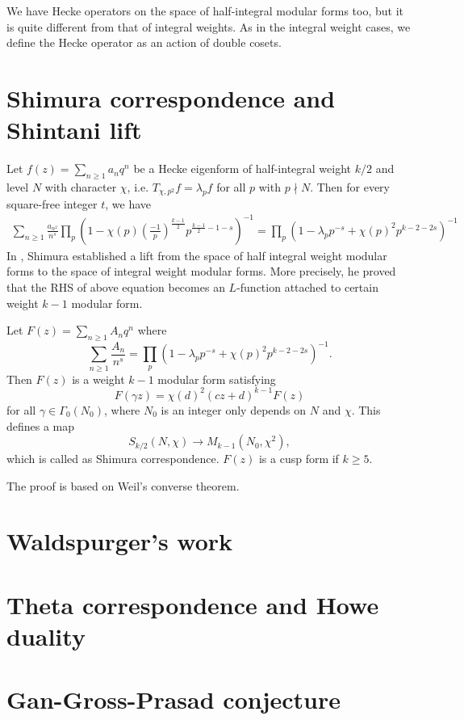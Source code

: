 We have Hecke operators on the space of half-integral modular forms too, but it is quite different from that of integral weights.
As in the integral weight cases, we define the Hecke operator as an action of double cosets.



\section{Shimura correspondence and Shintani lift}
Let $f(z) = \sum_{n \geq 1} a_{n}q^{n}$ be a Hecke eigenform of half-integral weight $k/2$ and level $N$ with character $\chi$, i.e.
$T_{\chi, p^{2}}f = \lambda_{p}f$ for all $p$ with $p\nmid N$.
Then for every square-free integer $t$, we have
\begin{align*}
    \sum_{n\geq 1} \frac{a_{n^{2}}}{n^{s}} \prod_{p} \left(1 - \chi(p)\left(\frac{-1}{p}\right)^{\frac{k-1}{2}}p^{\frac{k-1}{2}-1-s}\right)^{-1} = \prod_{p} (1 - \lambda_{p} p^{-s} + \chi(p)^{2}p^{k-2-2s})^{-1}
\end{align*}
In \cite{shimura1973onmodular}, Shimura established a lift from the space of 
half integral weight modular forms to the space of integral weight modular forms.
More precisely, he proved that the RHS of above equation becomes an $L$-function attached to
certain weight $k-1$ modular form.
\begin{theorem}
Let $F(z) = \sum_{n\geq 1} A_{n}q^{n}$ where
$$
\sum_{n\geq 1} \frac{A_{n}}{n^{s}} = \prod_{p} (1 - \lambda_{p} p^{-s} + \chi(p)^{2}p^{k-2-2s})^{-1}.
$$
Then $F(z)$ is a weight $k-1$ modular form satisfying
$$
F(\gamma z) = \chi(d)^{2}(cz + d)^{k-1} F(z)
$$
for all $\gamma \in \Gamma_{0}(N_{0})$, where $N_{0}$ is an integer only depends on $N$ and $\chi$.
This defines a map
$$S_{k/2}(N, \chi) \to M_{k-1}(N_{0}, \chi^{2}),$$
which is called as Shimura correspondence.
$F(z)$ is a cusp form if $k\geq 5$.
\end{theorem}
The proof is based on Weil's converse theorem.

\section{Waldspurger's work}

\section{Theta correspondence and Howe duality}

\section{Gan-Gross-Prasad conjecture}